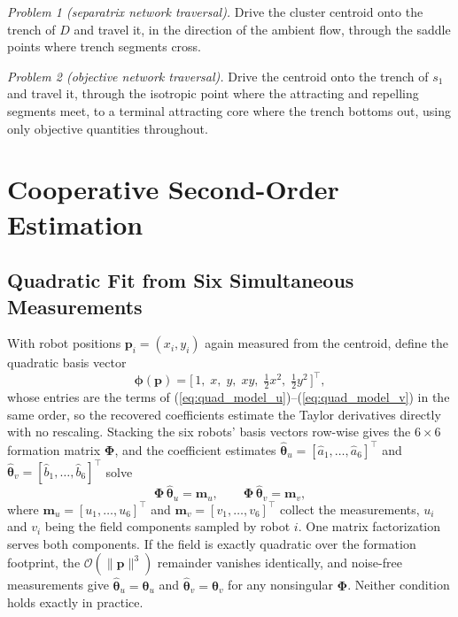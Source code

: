 \documentclass[lettersize,journal]{IEEEtran}
\begin{document}
\emph{Problem 1 (separatrix network traversal).} Drive the cluster
centroid onto the trench of $D$ and travel it, in the direction of the
ambient flow, through the saddle points where trench segments cross.

\emph{Problem 2 (objective network traversal).} Drive the centroid onto
the trench of $s_1$ and travel it, through the isotropic point where the
attracting and repelling segments meet, to a terminal attracting core
where the trench bottoms out, using only objective quantities throughout.


\section{Cooperative Second-Order Estimation}
\label{sec:estimation}

\subsection{Quadratic Fit from Six Simultaneous Measurements}

With robot positions $\mathbf{p}_i = (x_i, y_i)$ again measured from the
centroid, define the quadratic basis vector
\begin{equation}
    \boldsymbol{\phi}(\mathbf{p}) =
    \bigl[\,1, \; x, \; y, \; xy, \;
    \tfrac{1}{2}x^2, \; \tfrac{1}{2}y^2\,\bigr]^\top,
    \label{eq:basis}
\end{equation}
whose entries are the terms of
(\ref{eq:quad_model_u})--(\ref{eq:quad_model_v}) in the same order, so
the recovered coefficients estimate the Taylor derivatives directly with
no rescaling. Stacking the six robots' basis vectors row-wise gives
the $6 \times 6$ formation matrix $\boldsymbol{\Phi}$, and the coefficient
estimates $\hat{\boldsymbol{\theta}}_u = [\hat{a}_1, \ldots,
\hat{a}_6]^\top$ and $\hat{\boldsymbol{\theta}}_v = [\hat{b}_1, \ldots,
\hat{b}_6]^\top$ solve
\begin{equation}
    \boldsymbol{\Phi}\,\hat{\boldsymbol{\theta}}_u = \mathbf{m}_u, \qquad
    \boldsymbol{\Phi}\,\hat{\boldsymbol{\theta}}_v = \mathbf{m}_v,
    \label{eq:solve}
\end{equation}
where $\mathbf{m}_u = [u_1, \ldots, u_6]^\top$ and
$\mathbf{m}_v = [v_1, \ldots, v_6]^\top$ collect the measurements, $u_i$
and $v_i$ being the field components sampled by robot $i$. One matrix
factorization serves both components. If the field is exactly quadratic
over the formation footprint, the $\mathcal{O}(\|\mathbf{p}\|^3)$
remainder vanishes identically, and noise-free measurements give
$\hat{\boldsymbol{\theta}}_u = \boldsymbol{\theta}_u$ and
$\hat{\boldsymbol{\theta}}_v = \boldsymbol{\theta}_v$ for any nonsingular
$\boldsymbol{\Phi}$. Neither condition holds exactly in practice.
\end{document}
